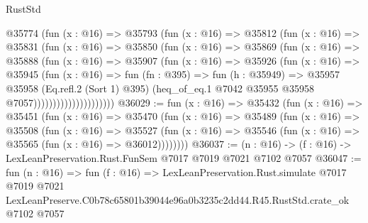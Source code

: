 \begin{lexlean}{RustStd}
\begin{coremodule}
                      @35774
                        (fun (x : @16) =>
                        @35793
                          (fun (x : @16) =>
                          @35812
                            (fun (x : @16) =>
                            @35831
                              (fun (x : @16) =>
                              @35850
                                (fun (x : @16) =>
                                @35869
                                  (fun (x : @16) =>
                                  @35888
                                    (fun (x : @16) =>
                                    @35907
                                      (fun (x : @16) =>
                                      @35926
                                        (fun (x : @16) =>
                                        @35945
                                          (fun (x : @16) =>
                                          fun (fn : @395) =>
                                          fun (h : @35949) =>
                                          @35957
                                            @35958
                                            (Eq.refl.{2} (Sort 1) @395)
                                            (heq_of_eq.{1}
                                              @7042
                                              @35955
                                              @35958
                                              @7057)))))))))))))))))))))
@36029 := fun (x : @16) =>
  @35432
    (fun (x : @16) =>
    @35451
      (fun (x : @16) =>
      @35470
        (fun (x : @16) =>
        @35489
          (fun (x : @16) =>
          @35508
            (fun (x : @16) =>
            @35527
              (fun (x : @16) => @35546 (fun (x : @16) => @35565 (fun (x : @16) => @36012))))))))
@36037 := (n : @16) -> (f : @16) -> LexLeanPreservation.Rust.FunSem @7017 @7019 @7021 @7102 @7057
@36047 := fun (n : @16) =>
  fun (f : @16) =>
  LexLeanPreservation.Rust.simulate
    @7017
    @7019
    @7021
    LexLeanPreserve.C0b78c65801b39044e96a0b3235c2dd44.R45.RustStd.crate_ok
    @7102
    @7057
\end{coremodule}
\end{lexlean}
